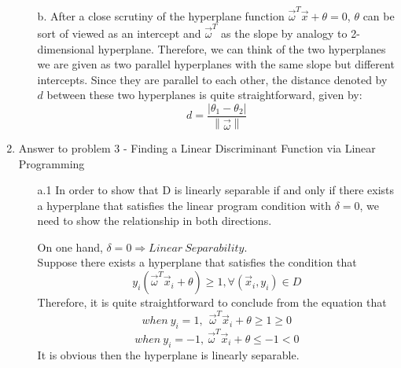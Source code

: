 \begin{enumerate}
\begin{enumerate}
	\item[b.]
	After a close scrutiny of the hyperplane function $\vec{\omega}^T \vec{x}+\theta =  0 $, $\theta$ can be sort of viewed as an intercept and $\vec{\omega}^T$ as the slope by analogy to 2-dimensional hyperplane. Therefore, we can think of the two hyperplanes we are given as two parallel hyperplanes with the same slope but different intercepts. Since they are parallel to each other, the distance denoted by $d$ between these two hyperplanes is quite straightforward, given by:
	\begin{equation*}
	d = \frac{\left | \theta_1 - \theta_2 \right |}{\left \| \vec{\omega} \right \|}
	\end{equation*}
	
	\end{enumerate}

\item Answer to problem 3 - Finding a Linear Discriminant Function via Linear Programming

	\begin{enumerate} \parindent -4pt
	
	\item[a.1]
	In order to show that D is linearly separable if and only if there exists a hyperplane that satisfies the linear program condition with $\delta = 0$, we need to show the relationship in both directions. 
	
	\medskip
	On one hand, $\delta = 0 \Rightarrow Linear\> Separability$. \\
	Suppose there exists a hyperplane that satisfies the condition that 
	\begin{equation*}
	y_i(\vec{\omega}^T\vec{x}_i + \theta) \geq 1, \forall(\vec{x}_i,y_i)\in D 
	\end{equation*}
	Therefore, it is quite straightforward to conclude from the equation that
	\begin{equation*}
	when\> y_i = 1,\>\> \vec{\omega}^T\vec{x}_i + \theta \geq 1 \geq 0
	\end{equation*}
	\begin{equation*}
	when\> y_i = -1, \>\vec{\omega}^T\vec{x}_i + \theta \leq -1 <0
	\end{equation*}
	It is obvious then the hyperplane is linearly separable. 
	

\end{enumerate}
\end{enumerate}
